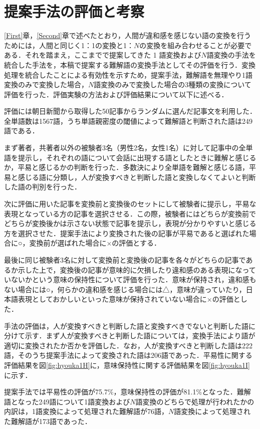 \documentclass[japanese]{jnlp_1.4}
\begin{document}
\section{提案手法の評価と考察}

\ref{First}章，\ref{Second}章で述べたとおり，人間が違和感を感じない語の変換を行うためには，人間と同じく1：1の変換と1：$N$の変換を組み合わせることが必要である．それを踏まえ，ここまでで提案してきた 1 語変換および$N$語変換の手法を統合した手法を，本稿で提案する難解語の変換手法としてその評価を行う．変換処理を統合したことによる有効性を示すため，提案手法，難解語を無理やり1語変換のみで変換した場合，$N$語変換のみで変換した場合の3種類の変換について評価を行った．評価実験の方法および評価結果について以下に述べる．

評価には朝日新聞から取得した50記事からランダムに選んだ記事文を利用した．全単語数は1567語，うち単語親密度の閾値によって難解語と判断された語は249語である．

まず著者，共著者以外の被験者3名（男性2名，女性1名）に対して記事中の全単語を提示し，それぞれの語について会話に出現する語としたときに難解と感じるか，平易と感じるかの判断を行った．多数決により全単語を難解と感じる語，平易と感じる語に分類し，人が変換すべきと判断した語と変換しなくてよいと判断した語の判別を行った．

次に評価に用いた記事を変換前と変換後のセットにして被験者に提示し，平易な表現となっている方の記事を選択させる．この際，被験者にはどちらが変換前でどちらが変換後かは示さない状態で記事を提示し，表現が分かりやすいと感じる方を選択させた．提案手法により変換された後の記事が平易であると選ばれた場合に○，変換前が選ばれた場合に×の評価とする．

最後に同じ被験者3名に対して変換前と変換後の記事を各々がどちらの記事であるか示した上で，変換後の記事が意味的に欠損したり違和感のある表現になっていないかという意味の保持性について評価を行った．意味が保持され，違和感もない場合には○，何らかの違和感を感じる場合には△，意味が違っていたり，日本語表現としておかしいといった意味が保持されていない場合に×の評価とした．

手法の評価は，人が変換すべきと判断した語と変換すべきでないと判断した語に分けて示す．まず人が変換すべきと判断した語については，変換手法により語が適切に変換されたか否かを評価した．なお，人が変換すべきと判断した語は222語，そのうち提案手法によって変換された語は206語であった．平易性に関する評価結果を図\ref{fig:hyouka1H}に，意味保持性に関する評価結果を図\ref{fig:hyouka1I}に示す．

提案手法では平易性の評価が75.7\%，意味保持性の評価が81.1\%となった．難解語となった249語について1語変換および$N$語変換のどちらで処理が行われたかの内訳は，1語変換によって処理された難解語が76語，$N$語変換によって処理された難解語が173語であった．
\end{document}
